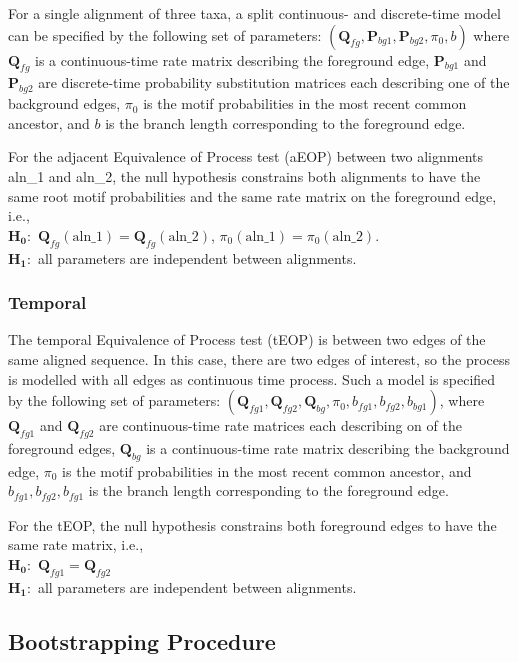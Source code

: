 For a single alignment of three taxa, a split continuous- and discrete-time model can be specified by the following set of parameters: $( \bm{Q}_{fg}, \bm{P}_{bg1}, \bm{P}_{bg2}, \pi_{0}, b ) $ where $\bm{Q}_{fg}$ is a continuous-time rate matrix describing the foreground edge,  $\bm{P}_{bg1}$ and $\bm{P}_{bg2}$ are discrete-time probability substitution matrices each describing one of the background edges, $\pi_{0}$ is the motif probabilities in the most recent common ancestor, and $b$ is the branch length corresponding to the foreground edge. 

For the adjacent Equivalence of Process test (aEOP) between two alignments aln\_1 and aln\_2, the null hypothesis constrains both alignments to have the same root motif probabilities and the same rate matrix on the foreground edge, i.e.,  \\
$\mathbf{H_0}:$ $\bm{Q}_{fg}(\text{aln\_1}) = \bm{Q}_{fg}(\text{aln\_2})$,  $\pi_0(\text{aln\_1}) = \pi_0(\text{aln\_2})$. \\
$\mathbf{H_1}:$ all parameters are independent between alignments. 

\subsubsection{Temporal }

The temporal Equivalence of Process test (tEOP) is between two edges of the same aligned sequence. In this case, there are two edges of interest, so the process is modelled with all edges as continuous time process. Such a model is specified by the following set of parameters: $( \bm{Q}_{fg1}, \bm{Q}_{fg2}, \bm{Q}_{bg}, \pi_{0}, b_{fg1}, b_{fg2}, b_{bg1}) $, where $\bm{Q}_{fg1}$ and $\bm{Q}_{fg2}$ are continuous-time rate matrices each describing on of the foreground edges,  $\bm{Q}_{bg}$ is a continuous-time rate matrix describing the background edge, $\pi_{0}$ is the motif probabilities in the most recent common ancestor, and $ b_{fg1}, b_{fg2}, b_{fg1}$ is the branch length corresponding to the foreground edge. 

For the tEOP, the null hypothesis constrains both foreground edges to have the same rate matrix, i.e., \\
$\mathbf{H_0}:$ $\bm{Q}_{fg1} = \bm{Q}_{fg2}$  \\ 
$\mathbf{H_1}:$ all parameters are independent between alignments. 

\subsection{Bootstrapping Procedure}

